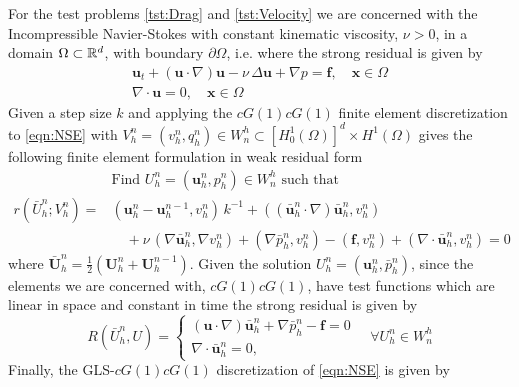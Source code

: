 For the test problems \ref{tst:Drag} and \ref{tst:Velocity} we are concerned
with the Incompressible Navier-Stokes with constant kinematic viscosity,
$\nu>0$, in a domain $\Omega\subset \mathbb{R}^d$, with boundary $\partial \Omega$, i.e.
where the strong residual is given by
\begin{equation}
    \begin{split}
      \mathbf{u}_t + \left( \mathbf{u} \cdot \nabla \right) \mathbf{u} - \nu\,
          \Delta \mathbf{u} + \nabla p = \mathbf{f}, \quad \mathbf{x} \in \Omega \\
          \nabla \cdot \mathbf{u} = 0, \quad \mathbf{x} \in \Omega
    \end{split}
  \label{eqn:NSE}
\end{equation}
Given a step size $k$ and applying the $cG(1)cG(1)$ finite element
discretization to \autoref{eqn:NSE} with $V^n_h = (v^n_h, q^n_h) \in W^h_n
\subset [H^1_0(\Omega)]^d \times H^1(\Omega)$ gives the following finite element
formulation in weak residual form
\begin{equation}
  \begin{split}
    &\text{Find } U^n_h = (\mathbf{u}^n_h, p^n_h) \in W^h_n \text{ such that} \\
    r(\bar{U}^n_h; V^n_h) =& (\mathbf{u}^n_h - \mathbf{u}^{n-1}_h, v^n_h)\,k^{-1}
        + (( \bar{\mathbf{u}}^n_h \cdot \nabla ) \bar{\mathbf{u}}^n_h, v^n_h) \\
    &\quad+ \nu\, (\nabla \bar{\mathbf{u}}^n_h, \nabla v^n_h)
        + (\nabla \bar{p}^n_h, v^n_h) - (\mathbf{f}, v^n_h)
        + (\nabla \cdot \bar{\mathbf{u}}^n_h, v^n_h) = 0
  \end{split}
  \label{eqn:WeakNSE}
\end{equation}
where $\bar{\mathbf{U}}^n_h = \frac{1}{2}\left(\mathbf{U}^n_h +
\mathbf{U}^{n-1}_h\right)$. Given the solution $U^n_h = (\mathbf{u}^n_h,
\bar{p}^n_h)$, since the elements we are concerned with, $cG(1)cG(1)$, have
test functions which are linear in space and constant in time the strong
residual is given by
\begin{equation}
    R(\bar{U}^n_h, U) = \begin{cases}
      \left(\mathbf{u} \cdot \nabla \right) \bar{\mathbf{u}}^n_h
        + \nabla \bar{p}^n_h - \mathbf{f} = 0 \\
      \nabla \cdot \bar{\mathbf{u}}^n_h = 0,
    \end{cases} \quad \forall U^n_h \in W^h_n
  \label{eqn:StrongNSE}
\end{equation}
Finally, the GLS-$cG(1)cG(1)$ discretization of \eqref{eqn:NSE} is given by
